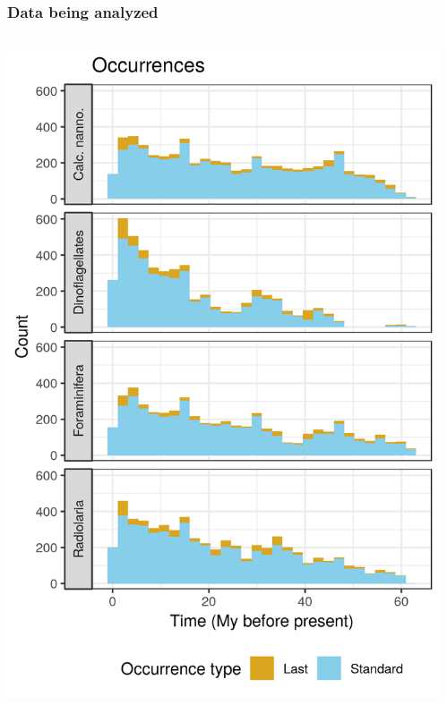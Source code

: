 \documentclass{beamer}
\begin{document}
\begin{frame}
  \frametitle{Data being analyzed}

  \begin{columns}
    \begin{column}{0.5\textwidth}
      \includegraphics[width=\textwidth,height=\textheight,keepaspectratio=true]{../results/figure/occ_time_label}
    \end{column}
    \begin{column}{0.5\textwidth}

\end{column}
\end{columns}
\end{frame}
\end{document}
